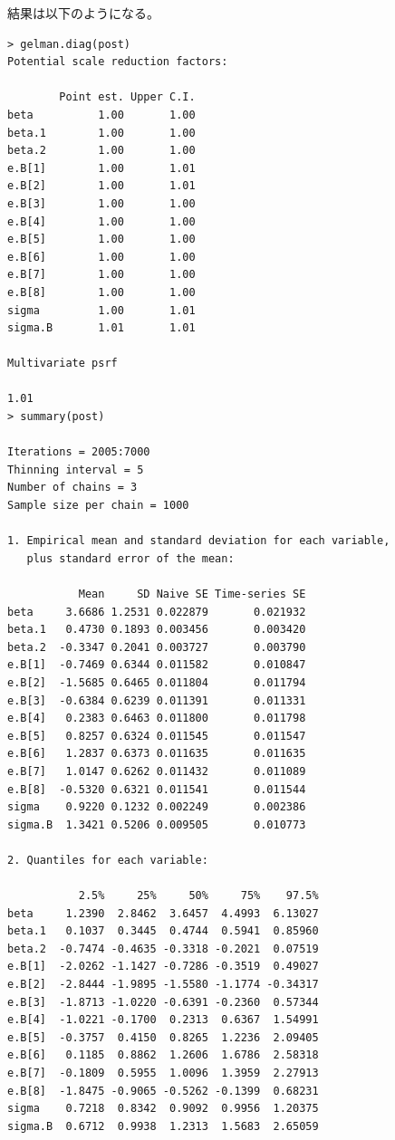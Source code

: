 \documentclass[11pt,uplatex]{jsarticle}
\begin{document}
結果は以下のようになる。
\vspace{1zw}
\begin{lstlisting}
> gelman.diag(post)
Potential scale reduction factors:

        Point est. Upper C.I.
beta          1.00       1.00
beta.1        1.00       1.00
beta.2        1.00       1.00
e.B[1]        1.00       1.01
e.B[2]        1.00       1.01
e.B[3]        1.00       1.00
e.B[4]        1.00       1.00
e.B[5]        1.00       1.00
e.B[6]        1.00       1.00
e.B[7]        1.00       1.00
e.B[8]        1.00       1.00
sigma         1.00       1.01
sigma.B       1.01       1.01

Multivariate psrf

1.01
> summary(post)

Iterations = 2005:7000
Thinning interval = 5 
Number of chains = 3 
Sample size per chain = 1000 

1. Empirical mean and standard deviation for each variable,
   plus standard error of the mean:

           Mean     SD Naive SE Time-series SE
beta     3.6686 1.2531 0.022879       0.021932
beta.1   0.4730 0.1893 0.003456       0.003420
beta.2  -0.3347 0.2041 0.003727       0.003790
e.B[1]  -0.7469 0.6344 0.011582       0.010847
e.B[2]  -1.5685 0.6465 0.011804       0.011794
e.B[3]  -0.6384 0.6239 0.011391       0.011331
e.B[4]   0.2383 0.6463 0.011800       0.011798
e.B[5]   0.8257 0.6324 0.011545       0.011547
e.B[6]   1.2837 0.6373 0.011635       0.011635
e.B[7]   1.0147 0.6262 0.011432       0.011089
e.B[8]  -0.5320 0.6321 0.011541       0.011544
sigma    0.9220 0.1232 0.002249       0.002386
sigma.B  1.3421 0.5206 0.009505       0.010773

2. Quantiles for each variable:

           2.5%     25%     50%     75%    97.5%
beta     1.2390  2.8462  3.6457  4.4993  6.13027
beta.1   0.1037  0.3445  0.4744  0.5941  0.85960
beta.2  -0.7474 -0.4635 -0.3318 -0.2021  0.07519
e.B[1]  -2.0262 -1.1427 -0.7286 -0.3519  0.49027
e.B[2]  -2.8444 -1.9895 -1.5580 -1.1774 -0.34317
e.B[3]  -1.8713 -1.0220 -0.6391 -0.2360  0.57344
e.B[4]  -1.0221 -0.1700  0.2313  0.6367  1.54991
e.B[5]  -0.3757  0.4150  0.8265  1.2236  2.09405
e.B[6]   0.1185  0.8862  1.2606  1.6786  2.58318
e.B[7]  -0.1809  0.5955  1.0096  1.3959  2.27913
e.B[8]  -1.8475 -0.9065 -0.5262 -0.1399  0.68231
sigma    0.7218  0.8342  0.9092  0.9956  1.20375
sigma.B  0.6712  0.9938  1.2313  1.5683  2.65059

\end{lstlisting}
\end{document}
